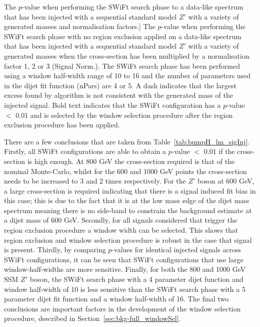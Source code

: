 \begin{table}[!ht]
\caption
    [The  \bh{} \mbox{$p$-value} when performing the SWiFt search phase to
      a data-like spectrum that has been injected with a sequential standard model $Z'$ with
      a variety of generated masses and normalisation factors.]
    {\label{tab:bumpH_lm_sigInj}
      The  \bh{} \mbox{$p$-value} when performing the SWiFt search phase with no region exclusion applied
      on a data-like spectrum that has been injected with a sequential standard model $Z'$ with
      a variety of generated masses when the cross-section has been multiplied by a normalisation factor 1, 2 or 3 (Signal Norm.).
      The SWiFt search phase has been performed using a window half-width range of 10 to 16
      and the number of parameters used in the dijet fit function (nPars) are 4 or 5.
      A dash indicates that the largest excess found by \bh{} algorithm is not consistent with the generated mass of the injected signal.
      Bold text indicates that the SWiFt configuration has a \bh{} $p$-value $<$ 0.01
      and is selected by the window selection procedure after the region exclusion procedure has been applied. }
\end{table}

There are a few conclusions that are taken from Table~\ref{tab:bumpH_lm_sigInj}.
Firstly, all SWiFt configurations are able to obtain a \bh{} $p$-value $<$ 0.01 if the cross-section is high enough.
At 800 GeV the cross-section required is that of the nominal Monte-Carlo, whilst for the 600 and 1000 GeV points
the cross-section needs to be increased to 3 and 2 times respectively.
For the $Z'$ boson at 600 GeV, a large cross-section is required indicating that
there is a signal induced fit bias in this case;
this is due to the fact that it is at the low mass edge of the
dijet mass spectrum meaning there is no side-band to constrain the background estimate at a dijet mass of 600 GeV.
Secondly, for all signals considered that trigger the region exclusion procedure a window width can be selected.
This shows that region exclusion and window selection procedure is robust in the case that signal is present.
Thirdly, by comparing \bh{} $p$-values for identical injected signals across SWiFt configurations,
it can be seen that SWiFt configurations that use large window-half-widths are more sensitive.
Finally, for both the 800 and 1000 GeV SSM $Z'$ boson,
the SWiFt search phase with a 4 parameter dijet function and window half-width of 10 is less sensitive than the
SWiFt search phase with a 5 parameter dijet fit function and a window half-width of 16.
The final two conclusions are important factors in the development of the window selection procedure, described in Section~\ref{sec:bkg-full_windowSel}.

